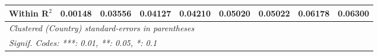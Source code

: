 \begin{table}[htbp]
\begin{tabular}{lcccccccc}
      Within R$^2$                                                     & 0.00148  & 0.03556        & 0.04127        & 0.04210       & 0.05020  & 0.05022  & 0.06178                & 0.06300\\  
      \midrule \midrule
      \multicolumn{9}{l}{\emph{Clustered (Country) standard-errors in parentheses}}\\
      \multicolumn{9}{l}{\emph{Signif. Codes: ***: 0.01, **: 0.05, *: 0.1}}\\
   \end{tabular}
\end{table}



